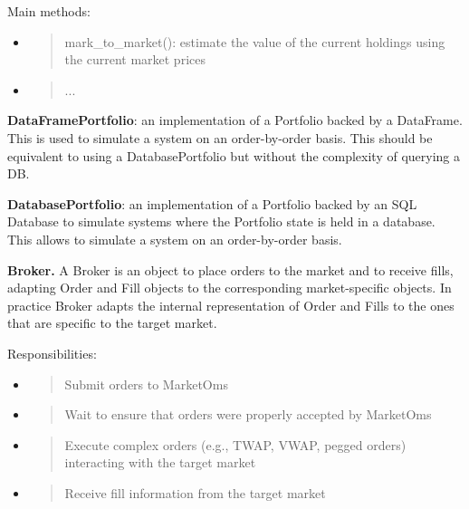 \documentclass[11pt, reqno]{amsart}
\begin{document}
Main methods:

\begin{itemize}
\item
  \begin{quote}
  mark\_to\_market(): estimate the value of the current holdings using
  the current market prices
  \end{quote}
\item
  \begin{quote}
  ...
  \end{quote}
\end{itemize}

\textbf{DataFramePortfolio}: an implementation of a Portfolio backed by
a DataFrame. This is used to simulate a system on an order-by-order
basis. This should be equivalent to using a DatabasePortfolio but
without the complexity of querying a DB.

\textbf{DatabasePortfolio}: an implementation of a Portfolio backed by
an SQL Database to simulate systems where the Portfolio state is held in
a database. This allows to simulate a system on an order-by-order basis.

\textbf{Broker.} A Broker is an object to place orders to the market and
to receive fills, adapting Order and Fill objects to the corresponding
market-specific objects. In practice Broker adapts the internal
representation of Order and Fills to the ones that are specific to the
target market.

Responsibilities:

\begin{itemize}
\item
  \begin{quote}
  Submit orders to MarketOms
  \end{quote}
\end{itemize}

\begin{itemize}
\item
  \begin{quote}
  Wait to ensure that orders were properly accepted by MarketOms
  \end{quote}
\item
  \begin{quote}
  Execute complex orders (e.g., TWAP, VWAP, pegged orders) interacting
  with the target market
  \end{quote}
\item
  \begin{quote}
  Receive fill information from the target market
  \end{quote}
\end{itemize}
\end{document}
